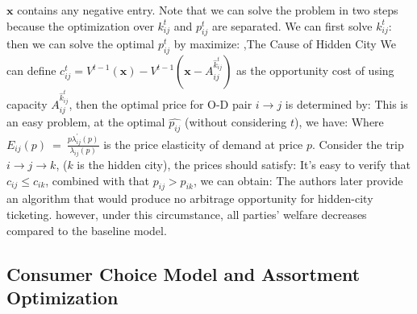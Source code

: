 \documentclass[12pt]{report}
\begin{document}
$\boldsymbol{x}$ contains any negative entry. Note that we can solve the problem in two steps because the optimization over $k_{ij}^t$ and $p_{ij}^t$ are separated. We can first solve $k_{ij}^t$:
then we can solve the optimal $p^t_{ij}$ by maximize:
\sep{The Cause of Hidden City}
We can define $c_{ij}^t=V^{t-1}(\boldsymbol{x})-V^{t-1}(\boldsymbol{x}-A_{ij}^{\hat{k}_{ij}^t})$ as the opportunity cost of using capacity $A_{ij}^{\hat{k}_{ij}^t}$, then the optimal price for O-D pair $i\to j$ is determined by:
This is an easy problem, at the optimal $\hat{p_{ij}}$ (without considering $t$), we have:
Where $E_{ij}(p)~=~\frac{p\lambda_{ij}^{\prime}(p)}{\lambda_{ij}(p)}$ is the price elasticity of demand at price $p$. Consider the trip $i\to j\to k$, ($k$ is the hidden city), the prices should satisfy:
It's easy to verify that $c_{ij}\le c_{ik}$, combined with that $p_{ij} > p_{ik}$, we can obtain:
The authors later provide an algorithm that would produce no arbitrage opportunity for hidden-city ticketing. however, under this circumstance, all parties' welfare
decreases compared to the baseline model.

\subsection{Consumer Choice Model and Assortment Optimization}
\end{document}
